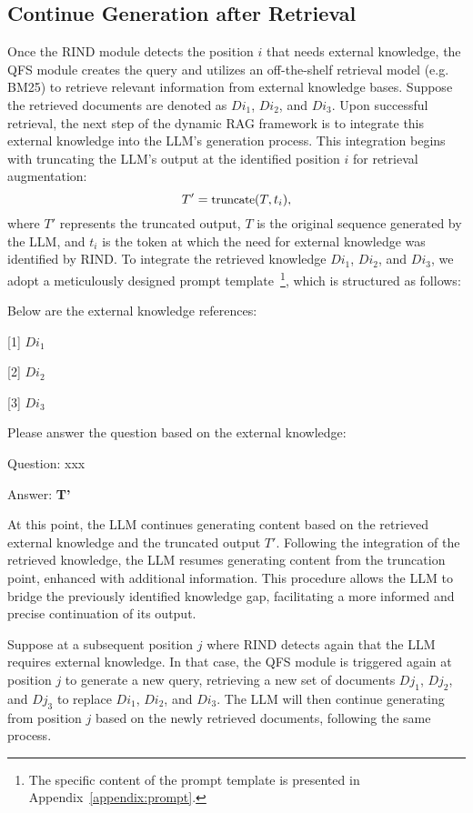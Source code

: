 \subsection{Continue Generation after Retrieval}

Once the RIND module detects the position $i$ that needs external knowledge, the QFS module creates the query and utilizes an off-the-shelf retrieval model (e.g. BM25) to retrieve relevant information from external knowledge bases. 
Suppose the retrieved documents are denoted as $Di_1$, $Di_2$, and $Di_3$.
Upon successful retrieval, the next step of the dynamic RAG framework is to integrate this external knowledge into the LLM's generation process. This integration begins with truncating the LLM's output at the identified position $i$ for retrieval augmentation:
\begin{equation}
\small
T' = \text{truncate}(T, t_{i}),
\end{equation}
where \(T'\) represents the truncated output, \(T\) is the original sequence generated by the LLM, and \(t_{i}\) is the token at which the need for external knowledge was identified by RIND. 
To integrate the retrieved knowledge $Di_1$, $Di_2$, and $Di_3$, we adopt a meticulously designed prompt template~\footnote{The specific content of the prompt template is presented in Appendix~\ref{appendix:prompt}.}, which is structured as follows:
\begin{tcolorbox}[colback=lightgray!20,colframe=darkgray!80,title=The entire input for LLM:]
Below are the external knowledge references:

[1] \textbf{$Di_1$}

[2] \textbf{$Di_2$}

[3] \textbf{$Di_3$}

Please answer the question based on the external knowledge:

Question: xxx

Answer: \textbf{T'}
\end{tcolorbox}
At this point, the LLM continues generating content based on the retrieved external knowledge and the truncated output $T'$.
Following the integration of the retrieved knowledge, the LLM resumes generating content from the truncation point, enhanced with additional information. 
This procedure allows the LLM to bridge the previously identified knowledge gap, facilitating a more informed and precise continuation of its output.

Suppose at a subsequent position $j$ where RIND detects again that the LLM requires external knowledge. In that case, the QFS module is triggered again at position $j$ to generate a new query, retrieving a new set of documents $Dj_1$, $Dj_2$, and $Dj_3$ to replace $Di_1$, $Di_2$, and $Di_3$.
The LLM will then continue generating from position $j$ based on the newly retrieved documents, following the same process.

